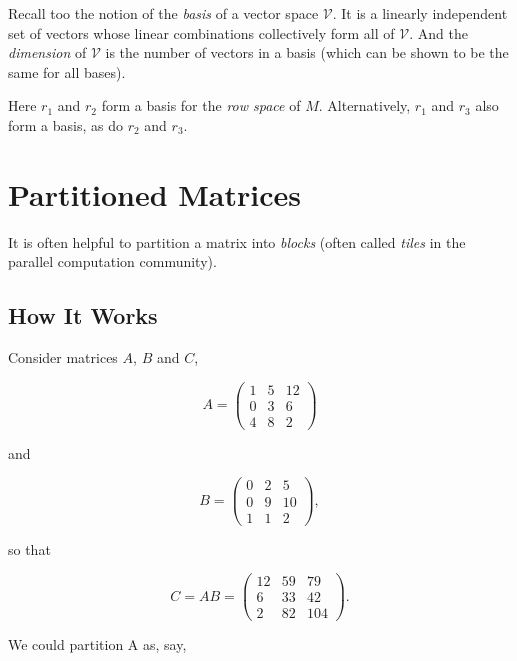 Recall too the notion of the \textit{basis} of a vector space
$\mathcal{V}$.  It is a linearly independent set of vectors whose linear
combinations collectively form all of $\mathcal{V}$.  And the
\textit{dimension} of $\mathcal{V}$ is the number of vectors in a basis
(which can be shown to be the same for all bases).


Here  $r_1$ and
$r_2$ form a basis for the \textit{row space} of $M$.  Alternatively,
$r_1$ and $r_3$ also form a basis, as do $r_2$ and $r_3$.

\section{Partitioned Matrices}
\label{partmat}

It is often helpful to partition a matrix into \textit{blocks} (often
called {\it tiles} in the parallel computation community).

\subsection{How It Works}

Consider matrices $A$, $B$ and $C$,

\begin{equation}
A = 
\left (
\begin{array}{ccc}
1 & 5 & 12 \\
0 & 3 & 6 \\
4 & 8 & 2
\end{array}
\right )
\end{equation}

and

\begin{equation}
B = 
\left (
\begin{array}{ccc}
0 & 2 & 5 \\
0 & 9 & 10 \\
1 & 1 & 2
\end{array}
\right ), 
\end{equation}

so that

\begin{equation}
C = AB = 
\left (
\begin{array}{ccc}
12 & 59 & 79 \\
6 & 33 & 42 \\
2 & 82 & 104
\end{array}
\right ) .
\end{equation}

We could partition A as, say,

